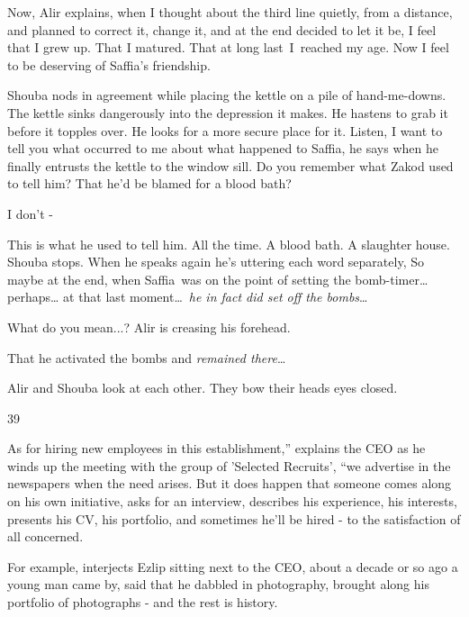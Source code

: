 \documentclass[twoside,11pt]{book}
\begin{document}
{\textquotedbl}Now,{\textquotedbl} Alir explains, {\textquotedbl}when I thought about the third line quietly, from a
distance, and planned to correct it, change it, and at the end decided to let it be, I feel that I grew up. That I
matured. That at long last~I\ reached my age. Now I feel to be deserving of Saffia's friendship.{\textquotedbl} 

Shouba nods in agreement while placing the kettle on a pile of hand-me-downs. The kettle sinks dangerously into the
depression it makes. He hastens to grab it before it topples over. He looks for a more secure place for it.
{\textquotedbl}Listen, I want to tell you what occurred to me about what happened to Saffia,{\textquotedbl} he says
when he finally entrusts the kettle to the window sill. {\textquotedbl}Do you remember what Zakod used to tell him?
That he'd be blamed for a blood bath?{\textquotedbl} 

{\textquotedbl}I don't -{\textquotedbl} 

{\textquotedbl}This is what he used to tell him. All the time. A blood bath. A slaughter house.{\textquotedbl} Shouba
stops. When he speaks again he{}'s uttering each word separately, {\textquotedbl}So maybe at the end, when Saffia~was
on the point of setting the bomb-timer{\dots} perhaps{\dots} at that last moment{\dots}~\textit{he in fact did set off
the bombs}{\dots}{\textquotedbl} 

{\textquotedbl}What do you mean...?{\textquotedbl} Alir is creasing his forehead.

{\textquotedbl}That he activated the bombs and \textit{remained there}{\dots}{\textquotedbl}

Alir and Shouba look at each other. They bow their heads eyes closed. 


\bigskip

39~~~~~~~~~~~~~~~~~~~ 

{\textquotedbl}As for hiring new employees in this establishment,{}'' explains the CEO as he winds up the meeting with
the group of 'Selected Recruits', ``we advertise in the newspapers when the need arises. But it does happen that
someone comes along on his own initiative, asks for an interview, describes his experience, his interests, presents his
CV, his portfolio, and sometimes he'll be hired - to the satisfaction of all concerned.{\textquotedbl} 

{\textquotedbl}For example,{\textquotedbl} interjects Ezlip sitting next to the CEO, {\textquotedbl}about a decade or so
ago a young man came by, said that he dabbled in photography, brought along his portfolio of photographs - and the rest
is history.{\textquotedbl} 
\end{document}
